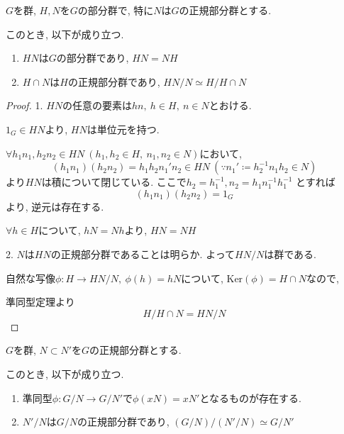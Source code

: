 \begin{theotcolorbox}[title = 第二同型定理]
    $G$を群, $H, N$を$G$の部分群で, 特に$N$は$G$の正規部分群とする.

    このとき, 以下が成り立つ.

    \begin{enumerate}
        \item $HN$は$G$の部分群であり, $HN=NH$
        \item $H \cap N$は$H$の正規部分群であり, $HN/N \simeq H/H \cap N$
    \end{enumerate}
\end{theotcolorbox}

\begin{proof}
    \large{1.} $HN$の任意の要素は$hn,\ h \in H,\ n \in N$とおける.

    $1_G \in HN$より, $HN$は単位元を持つ.
    
    $\forall h_1n_1, h_2n_2 \in HN\ (h_1, h_2 \in H,\ n_1, n_2 \in N)$において, 
    \begin{equation*}
        (h_1n_1)(h_2n_2) = h_1 h_2 n_1' n_2 \in HN \ (\because n_1' \coloneq h_2^{-1} n_1 h_2 \in N)
    \end{equation*}
    より$HN$は積について閉じている. ここで$h_2 = h_1^{-1}, n_2 = h_1 n_1^{-1} h_1^{-1}$
    とすれば
    \begin{equation*}
        (h_1n_1)(h_2n_2) = 1_G
    \end{equation*}
    より, 逆元は存在する. 

    $\forall h \in H$について, $hN = Nh$より, $HN=NH$

    \large{2.} $N$は$HN$の正規部分群であることは明らか. よって$HN/N$は群である.

    自然な写像$\phi:H \rightarrow HN/N,\ \phi(h) = hN$について, $\mathrm{Ker}(\phi) = H \cap N$なので, 
    
    準同型定理より
    \begin{equation*}
        H/H \cap N = HN/N
    \end{equation*}
\end{proof}

\begin{theotcolorbox}[title = 第三同型定理]
    $G$を群, $N \subset N'$を$G$の正規部分群とする.

    このとき, 以下が成り立つ.
    \begin{enumerate}
        \item 準同型$\phi:G/N \rightarrow G/N'$で$\phi(xN)=xN'$となるものが存在する.
        \item $N'/N$は$G/N$の正規部分群であり, $(G/N)/(N'/N) \simeq G/N'$
    \end{enumerate}
\end{theotcolorbox}

